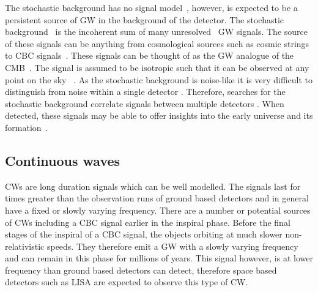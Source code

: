 The stochastic background has no signal model~, however, is expected to be a
persistent source of \gls{GW} in the background of the detector.  The
stochastic background~ is the
incoherent sum of many unresolved~ \gls{GW}
signals.  The source of these signals can be anything from cosmological sources
such as cosmic strings to \gls{CBC} signals~.
These signals can be thought of as the \gls{GW} analogue of the
\gls{CMB}~.  The signal is
assumed to be isotropic such that it can be observed at any point on the sky
\citep{christensen2018StochasticGravitational}~.
As the stochastic background is noise-like it is very difficult to distinguish
from noise within a single detector
\citep{christensen2018StochasticGravitational}.  Therefore, searches for the
stochastic background correlate signals between multiple detectors
\citep{romano2019SearchesStochastic,christensen2018StochasticGravitational}.
When detected, these signals may be able to offer insights into the early
universe and its formation~.



\subsection{\label{intro:sources:cw}Continuous waves}

\glspl{CW} are long duration signals which can be well modelled.
The signals last for times greater than the observation runs of ground based detectors and in general have a fixed or slowly varying frequency.
There are a number or potential sources of \glspl{CW} including a \gls{CBC} signal earlier in the inspiral phase.
Before the final stages of the inspiral of a \gls{CBC} signal, the objects orbiting at much slower non-relativistic speeds. They therefore emit a \gls{GW} with a slowly varying frequency and can remain in this phase for millions of years. 
This signal however, is at lower frequency than ground based detectors can detect, therefore space based detectors such as \gls{LISA} \citep{danzmann1996LISALaser} are expected to observe this type of \gls{CW}.

